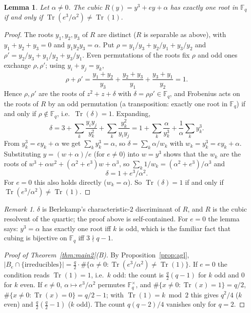 \documentclass[11pt,a4paper]{amsart}
\newtheorem{lemma}[theorem]{Lemma}
\theoremstyle{definition}
\theoremstyle{remark}
\newtheorem{remark}[theorem]{Remark}
\newcommand{\F}{\mathbb{F}}
\newcommand{\Tr}{\operatorname{Tr}}
\begin{document}
\begin{lemma}\label{lem:oneroot}
Let $\alpha\ne0$. The cubic $R(y)=y^3+ey+\alpha$ has exactly one root in $\F_q$ if and only if
$\Tr(e^3/\alpha^2)\ne\Tr(1)$.
\end{lemma}

\begin{proof}
The roots $y_1,y_2,y_3$ of $R$ are distinct ($R$ is separable as above), with $y_1+y_2+y_3=0$ and $y_1y_2y_3=\alpha$.
Put $\rho=y_1/y_3+y_2/y_1+y_3/y_2$ and $\rho'=y_2/y_3+y_1/y_2+y_3/y_1$. Even permutations of the roots fix $\rho$ and
odd ones exchange $\rho,\rho'$; using $y_i+y_j=y_k$,
\[
\rho+\rho'=\frac{y_1+y_2}{y_3}+\frac{y_2+y_3}{y_1}+\frac{y_3+y_1}{y_2}=1 .
\]
Hence $\rho,\rho'$ are the roots of $z^2+z+\delta$ with $\delta=\rho\rho'\in\F_q$, and Frobenius acts on the roots of
$R$ by an odd permutation (a transposition: exactly one root in $\F_q$) if and only if $\rho\notin\F_q$, i.e.\
$\Tr(\delta)=1$. Expanding,
\[
\delta=3+\sum_k\frac{y_iy_j}{y_k^2}+\sum_k\frac{y_k^2}{y_iy_j}
=1+\sum_k\frac{\alpha}{y_k^3}+\frac{1}{\alpha}\sum_k y_k^3 .
\]
From $y_k^3=ey_k+\alpha$ we get $\sum_k y_k^3=\alpha$, so $\delta=\sum_k\alpha/w_k$ with $w_k=y_k^3=ey_k+\alpha$.
Substituting $y=(w+\alpha)/e$ (for $e\ne0$) into $w=y^3$ shows that the $w_k$ are the roots of
$w^3+\alpha w^2+(\alpha^2+e^3)w+\alpha^3$, so $\sum_k1/w_k=(\alpha^2+e^3)/\alpha^3$ and
\[
\delta=1+e^3/\alpha^2 .
\]
For $e=0$ this also holds directly ($w_k=\alpha$). So $\Tr(\delta)=1$ if and only if $\Tr(e^3/\alpha^2)\ne\Tr(1)$.
\end{proof}

\begin{remark}
$\delta$ is Berlekamp's characteristic-$2$ discriminant \cite{Berlekamp76} of $R$, and $R$ is the cubic resolvent of
the quartic; the proof above is self-contained. For $e=0$ the lemma says: $y^3=\alpha$ has exactly one root iff $k$ is
odd, which is the familiar fact that cubing is bijective on $\F_q$ iff $3\nmid q-1$.
\end{remark}

\begin{proof}[Proof of Theorem~\ref{thm:main2}(B)]
By Proposition~\ref{prop:agl}, $|B_e\cap\{\text{irreducibles}\}|=\frac q2\cdot\#\{\alpha\ne0:\Tr(e^3/\alpha^2)\ne\Tr(1)\}$.
If $e=0$ the condition reads $\Tr(1)=1$, i.e.\ $k$ odd: the count is $\frac q2(q-1)$ for $k$ odd and $0$ for $k$ even.
If $e\ne0$, $\alpha\mapsto e^3/\alpha^2$ permutes $\F_q^\times$, and $\#\{x\ne0:\Tr(x)=1\}=q/2$,
$\#\{x\ne0:\Tr(x)=0\}=q/2-1$; with $\Tr(1)=k\bmod2$ this gives $q^2/4$ ($k$ even) and $\frac q2(\frac q2-1)$ ($k$
odd). The count $q(q-2)/4$ vanishes only for $q=2$.
\end{proof}
\end{document}
